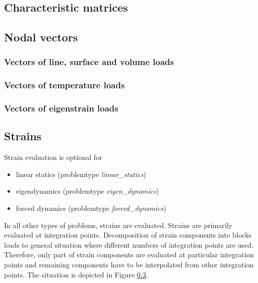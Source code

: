 \subsection{Characteristic matrices}

\subsection{Nodal vectors}

\subsubsection{Vectors of line, surface and volume loads}

\subsubsection{Vectors of temperature loads}

\subsubsection{Vectors of eigenstrain loads}


\subsection{Strains}

Strain evaluation is optional for
\begin{itemize}
\item
linear statics ({\sf problemtype} {\it linear\_statics})
\item
eigendynamics ({\sf problemtype} {\it eigen\_dynamics})
\item
forced dynamics ({\sf problemtype} {\it forced\_dynamics})
\end{itemize}
In all other types of problems, strains are evaluated.
Strains are primarily evaluated at integration points. Decomposition of strain
components into blocks leads to general situation where different numbers of
integration points are used. Therefore, only part of strain components are
evaluated at particular integration points and remaining components have to
be interpolated from other integration points. The situation is depicted in
Figure \ref{}.


